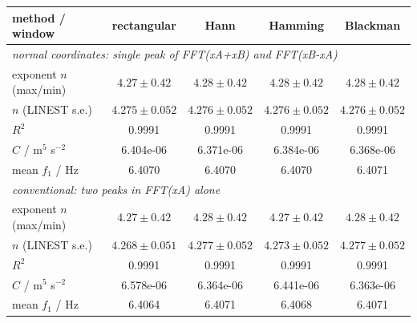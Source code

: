 \begin{tabular}{@{}lcccc@{}}
\toprule
method / window & rectangular & Hann & Hamming & Blackman \\
\midrule
\multicolumn{5}{l}{\emph{normal coordinates: single peak of FFT(xA+xB) and FFT(xB-xA)}} \\
exponent $n$ (max/min) & $4.27\pm0.42$ & $4.28\pm0.42$ & $4.28\pm0.42$ & $4.28\pm0.42$ \\
$n$ (LINEST s.e.) & $4.275\pm0.052$ & $4.276\pm0.052$ & $4.276\pm0.052$ & $4.276\pm0.052$ \\
$R^2$ & 0.9991 & 0.9991 & 0.9991 & 0.9991 \\
$C$ / m$^5$ s$^{-2}$ & 6.404e-06 & 6.371e-06 & 6.384e-06 & 6.368e-06 \\
mean $f_1$ / Hz & 6.4070 & 6.4070 & 6.4070 & 6.4071 \\
\midrule
\multicolumn{5}{l}{\emph{conventional: two peaks in FFT(xA) alone}} \\
exponent $n$ (max/min) & $4.27\pm0.42$ & $4.28\pm0.42$ & $4.27\pm0.42$ & $4.28\pm0.42$ \\
$n$ (LINEST s.e.) & $4.268\pm0.051$ & $4.277\pm0.052$ & $4.273\pm0.052$ & $4.277\pm0.052$ \\
$R^2$ & 0.9991 & 0.9991 & 0.9991 & 0.9991 \\
$C$ / m$^5$ s$^{-2}$ & 6.578e-06 & 6.364e-06 & 6.441e-06 & 6.363e-06 \\
mean $f_1$ / Hz & 6.4064 & 6.4071 & 6.4068 & 6.4071 \\
\bottomrule
\end{tabular}